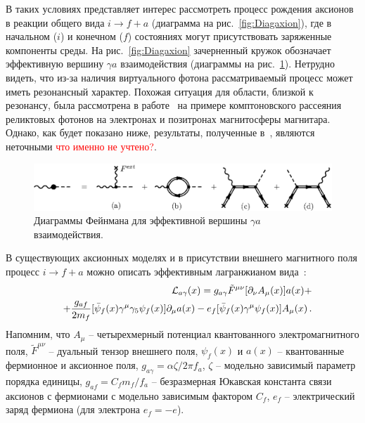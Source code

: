 В таких условиях представляет интерес рассмотреть процесс рождения аксионов   в 
реакции общего вида $i \to f + a$ (диаграмма на рис.~\ref{fig:Diagaxion}), 
где в начальном ($i$) и конечном ($f$) состояниях могут присутствовать 
заряженные компоненты среды. 
На рис.~\ref{fig:Diagaxion} зачерненный
кружок обозначает эффективную вершину $\gamma a$ взаимодействия
(диаграммы на рис.~\ref{fig:vertexaxion}). Нетрудно видеть, что из-за наличия виртуального 
фотона рассматриваемый процесс может иметь резонансный характер. Похожая ситуация
для области, близкой к резонансу, была рассмотрена в работе~\cite{Skobelev:2007} 
на примере
комптоновского рассеяния реликтовых фотонов на электронах и позитронах магнитосферы
магнитара. Однако, как будет показано ниже,  результаты, полученные 
в~\cite{Skobelev:2007}, являются неточными \textcolor{red}{что именно не учтено?}. 

\begin{figure}
\centerline{\includegraphics[width=15cm]{fig5_2.eps}}
\caption{ Диаграммы Фейнмана для эффективной вершины $\gamma a$ 
взаимодействия.}
\label{fig:vertexaxion}
\end{figure}



 В существующих аксионных моделях и в присутствии 
внешнего магнитного поля процесс  $i \to f+a$ 
можно описать эффективным лагранжианом вида~\cite{Raffelt:1996}:
%
\begin{eqnarray}
\label{eq:L1}
&&{\cal L}_{a\gamma}(x) = g_{a\gamma}\tilde F^{\mu \nu} [\partial_{\nu}A_{\mu}(x)] a(x) + 
\\
\nonumber
&& + \frac{g_{af}}{2m_f} 
[\bar \psi_f(x) \gamma^{\mu} \gamma_5 \psi_f(x)] \partial_{\mu} a(x) - 
 e_f[\bar \psi_f(x) \gamma^{\mu} \psi_f(x)]A_{\mu}(x) \, .
\end{eqnarray}
%
\noindent Напомним, что  $A_{\mu}$ -- четырехмерный потенциал квантованного электромагнитного
поля, $\tilde F^{\mu \nu}$ --  дуальный тензор внешнего поля,  $\psi_f(x)$  и $a(x)$ --  
квантованные фермионное и аксионное поля, 
  $g_{a\gamma} = \alpha \zeta/2\pi f_a$, $\zeta$ --  модельно зависимый 
параметр порядка единицы, 
$g_{af} = C_f m_f/f_a$ -- безразмерная Юкавская константа связи аксионов с 
фермионами с модельно зависимым фактором $C_f$, $e_f$ -- электрический заряд 
фермиона (для электрона $e_f = - e$). 

